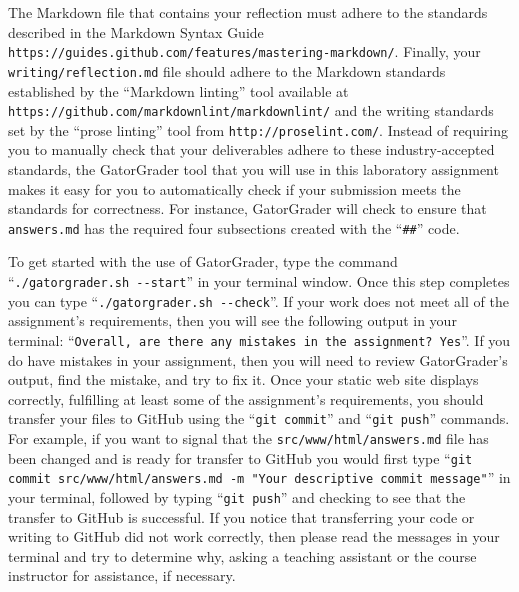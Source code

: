 \documentclass[11pt]{article}
\newcommand{\mainprogram}{\lstinline{answers.md}}
\newcommand{\mainprogramsource}{\lstinline{src/www/html/answers.md}}
\newcommand{\reflection}{\lstinline{writing/reflection.md}}
\newcommand{\gatorgraderstart}{\command{./gatorgrader.sh --start}}
\newcommand{\gatorgradercheck}{\command{./gatorgrader.sh --check}}
\newcommand{\gitcommit}{\command{git commit}}
\newcommand{\gitpush}{\command{git push}}
\newcommand{\gitcommitmainprogram}{\command{git commit src/www/html/answers.md -m "Your
descriptive commit message"}}
\newcommand{\command}[1]{``\lstinline{#1}''}
\newcommand{\url}[1]{\lstinline{#1}}
\newcommand{\step}[1]{``{#1}''}
\begin{document}
The Markdown file that contains your reflection must adhere to the standards described in the Markdown Syntax Guide
\url{https://guides.github.com/features/mastering-markdown/}. Finally, your \reflection{} file should adhere to the
Markdown standards established by the \step{Markdown linting} tool available at
\url{https://github.com/markdownlint/markdownlint/} and the writing standards set by the \step{prose linting} tool from
\url{http://proselint.com/}. Instead of requiring you to manually check that your deliverables adhere to these
industry-accepted standards, the GatorGrader tool that you will use in this laboratory assignment makes it easy for you
to automatically check if your submission meets the standards for correctness. For instance, GatorGrader will check to
ensure that \mainprogram{} has the required four subsections created with the \command{##} code.

To get started with the use of GatorGrader, type the command \gatorgraderstart{} in your terminal window. Once this step
completes you can type \gatorgradercheck{}. If your work does not meet all of the assignment's requirements, then you
will see the following output in your terminal: \command{Overall, are there any mistakes in the assignment? Yes}. If you
do have mistakes in your assignment, then you will need to review GatorGrader's output, find the mistake, and try to fix
it. Once your static web site displays correctly, fulfilling at least some of the assignment's requirements, you should
transfer your files to GitHub using the \gitcommit{} and \gitpush{} commands. For example, if you want to signal that
the \mainprogramsource{} file has been changed and is ready for transfer to GitHub you would first type
\gitcommitmainprogram{} in your terminal, followed by typing \gitpush{} and checking to see that the transfer to GitHub
is successful. If you notice that transferring your code or writing to GitHub did not work correctly, then please read
the messages in your terminal and try to determine why, asking a teaching assistant or the course instructor for
assistance, if necessary.
\end{document}
